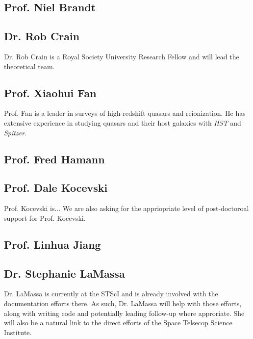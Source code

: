 \iffalse
\subsection{Prof. Beth Biller}
Prof. Biller is an expert in infrared coronagraphic observations. 
While we do not intend to use the MIRI coronagraphs in this proposal, 
longer term observations would potentially involve observing the ERQs
with the Lyot or 4QPM if this became appropriate and technically feasible. 
\fi


\subsection{Prof. Niel Brandt}


\subsection{Dr. Rob Crain}
Dr. Rob Crain is a Royal Society University Research Fellow and will 
lead the theoretical team. 


\subsection{Prof. Xiaohui Fan}
Prof. Fan is a leader in surveys of high-redshift quasars and
reionization. He has extensive experience in studying quasars and
their host galaxies with {\it HST} and {\it Spitzer}.


\subsection{Prof. Fred Hamann}


\subsection{Prof. Dale Kocevski}
Prof. Kocevski is...
We are also asking for the appriopriate level of 
post-doctoroal support for Prof. Kocevski. 

\subsection{Prof. Linhua Jiang}


\subsection{Dr. Stephanie LaMassa}
Dr. LaMassa is currently at the STScI and is already involved with the
documentation efforts there. As such, Dr. LaMassa will help with those
efforts, along with writing code and potentially leading follow-up
where approriate. She will also be a natural link to the direct
efforts of the Space Telsecop Science Institute.


